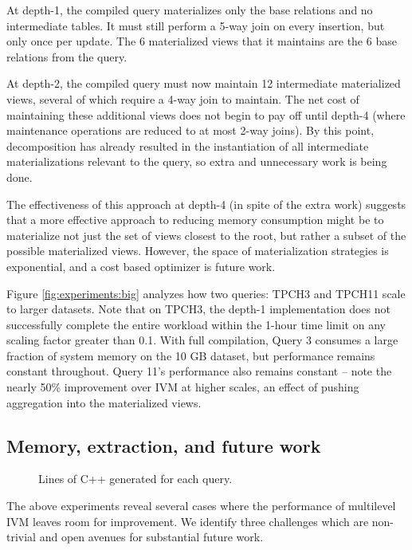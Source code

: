 At depth-1, the compiled query materializes only the base relations and no intermediate tables.  It must still perform a 5-way join on every insertion, but  only once per update.  The 6 materialized views that it maintains are the 6 base relations from the query.  

At depth-2, the compiled query must now maintain 12 intermediate materialized views, several of which require a 4-way join to maintain.  The net cost of maintaining these additional views does not begin to pay off until depth-4 (where maintenance operations are reduced to at most 2-way joins).  By this point, decomposition has already resulted in the instantiation of all intermediate materializations relevant to the query, so extra and unnecessary work is being done.  

The effectiveness of this approach at depth-4 (in spite of the extra work) suggests that a more effective approach to reducing memory consumption might be to materialize not just the set of views closest to the root, but rather a subset of the possible materialized views.  However, the space of materialization strategies is exponential, and a cost based optimizer is future work.

Figure \ref{fig:experiments:big} analyzes how two queries: TPCH3 and TPCH11 scale to larger datasets.  Note that on TPCH3, the depth-1 implementation does not successfully complete the entire workload within the 1-hour time limit on any scaling factor greater than 0.1.  With full compilation, Query 3 consumes a large fraction of system memory on the 10 GB dataset, but performance remains constant throughout.  Query 11's performance also remains constant -- note the nearly 50\% improvement over IVM at higher scales, an effect of pushing aggregation into the materialized views.

\subsection{Memory, extraction, and future work}
\label{sec:experiments:future}

\begin{figure}
\begin{center}

\caption{Lines of C++ generated for each query.}
\label{fig:experiments:loc}
\end{center}
\vspace*{-0.35in}
\end{figure}

The above experiments reveal several cases where the performance of multilevel IVM leaves room for improvement.  We identify three challenges which are non-trivial and open avenues for substantial future work.

